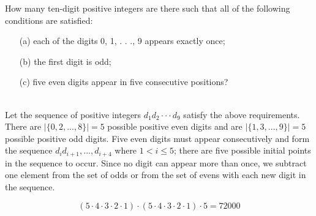 How many ten-digit positive integers are there such that all of the following conditions are satisfied:
\begin{itemize}
 \item[(a)] each of the digits 0, 1, . . ., 9 appears exactly once;
 \item[(b)] the first digit is odd;
 \item[(c)] five even digits appear in five consecutive positions?
\end{itemize}
\begin{solution}\ \\
Let the sequence of positive integers \(d_1d_2 \cdot\cdot\cdot d_9\) satisfy the above requirements. There are \(|\{0, 2, . . ., 8\}| = 5\) possible positive even digits and are \(|\{1, 3, . . ., 9\}| = 5\) possible positive odd digits. Five even digits must appear consecutively and form the sequence \(d_id_{i+1}, . . ., d_{i+4}\) where \(1 < i \leqslant 5\); there are five possible initial points in the sequence to occur. Since no digit can appear more than once, we subtract one element from the set of odds or from the set of evens with each new digit in the sequence.

\[(5 \cdot 4 \cdot 3 \cdot 2 \cdot 1) \cdot (5 \cdot 4 \cdot 3 \cdot 2 \cdot 1) \cdot 5 = 72000\]
\end{solution}

